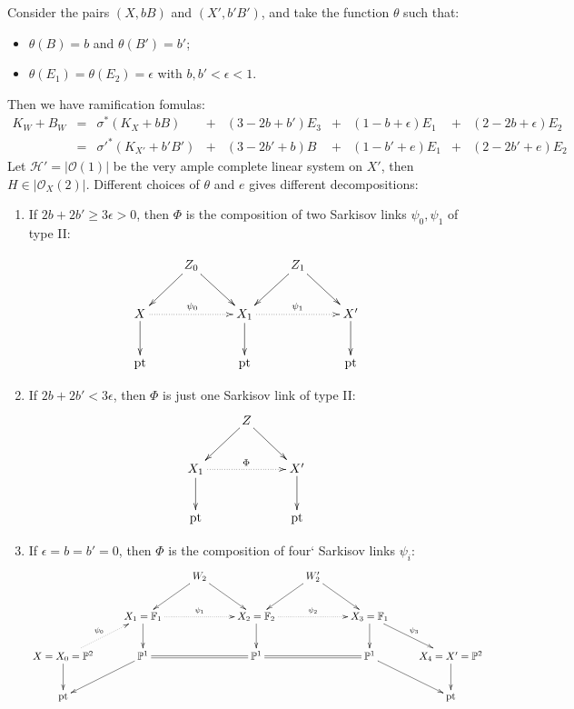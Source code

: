 \documentclass[11pt]{amsart}
\begin{document}
Consider the pairs $ (X,bB) $ and $ (X',b'B') $, and take the function $\theta$ such that:
\begin{itemize}
  \item $\theta(B)=b$ and $\theta(B')=b'$;
  \item $\theta(E_{1})=\theta(E_{2})=\epsilon$ with $b,b'<\epsilon<1$. 
\end{itemize}
Then we have ramification fomulas:
\[ \begin{array}{rllllllllll}
  K_W+B_W&=&\sigma^*(K_X+bB)&+& (3-2b+b')E_3&+&(1-b+\epsilon)E_1&+&(2-2b+\epsilon)E_2&\\
  &=&\sigma'^*(K_{X'}+b'B')&+&(3-2b'+b)B&+&(1-b'+e)E_1&+&(2-2b'+e)E_2&
\end{array} \]
Let $ \mathcal{H}'=|\mathcal{O}(1)| $ be the very ample complete linear system on $X'$, then $H\in |\mathcal{O}_{X}(2)|$. Different choices of $\theta$ and  $e$ gives different decompositions: 
\begin{enumerate}
  \item\label{example1.1} If $ 2b+2b'\geqslant 3\epsilon>0 $, then $\Phi$ is the composition of two Sarkisov links $\psi_{0},\psi_{1}$ of type II:

    \[
      \xymatrix{
    &Z_{0}\ar[rd]\ar[ld] & &Z_{1}\ar[rd]\ar[ld]\\
        X\ar[d]\ar@{.>}[rr]^{\psi_{0}}& &X_{1}\ar@{.>}[rr]^{\psi_{1}}\ar[d]&&X'\ar[d]\\
        \text{pt}&&\text{pt}&&\text{pt}
      }
    \]
  \item If $ 2b+2b'< 3\epsilon $, then $\Phi$ is just one Sarkisov link  of type II:
    \[
      \xymatrix{
    &Z\ar[rd]\ar[ld] & \\
        X_{1}\ar@{.>}[rr]^{\Phi}\ar[d]& &X'\ar[d]\\
        \text{pt}&&\text{pt}
      }
    \]
  \item If $ \epsilon=b=b'=0 $, then $\Phi$ is the composition of four` Sarkisov links $\psi_{i}$:
\[ \xymatrix{
&&W_2\ar[ld]\ar[rd]&&W_2'\ar[ld]\ar[rd]\\
&X_1=\mathbb{F}_1\ar@{.>}[rr]^{\psi_{1}}\ar[d]&&X_2=\mathbb{F}_2\ar@{.>}[rr]^{\psi_{2}}\ar[d]&&X_3=\mathbb{F}_1\ar[d]\ar[rd]^{\psi_{3}}\\
X=X_0=\mathbb{P}^2\ar[d]\ar@{.>}[ru]^{\psi_{0}}&\mathbb{P}^1\ar[ld]\ar@{=}[rr]&&\mathbb{P}^1\ar@{=}[rr]&&\mathbb{P}^1\ar[rd]&X_4=X'=\mathbb{P}^2\ar[d]\\
\text{pt}&&&&&&\text{pt} } \]
\end{enumerate}
\end{document}

